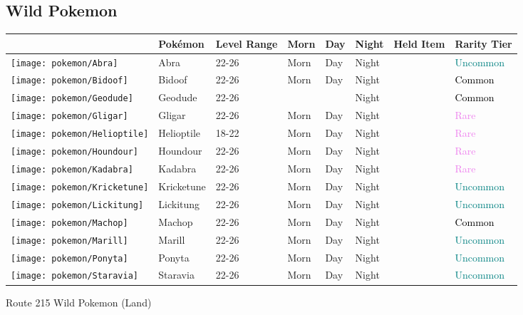 \subsection{Wild Pokemon}%
\label{subsec:WildPokemon}%
\begin{longtable}{||l l l l l l l l||}%
\hline%
&Pokémon&Level Range&Morn&Day&Night&Held Item&Rarity Tier\\%
\hline%
\endhead%
\hline%
\texttt{[image: pokemon/Abra]}&Abra&22{-}26&Morn&Day&Night&&\textcolor{teal}{%
Uncommon%
}\\%
\hline%
\texttt{[image: pokemon/Bidoof]}&Bidoof&22{-}26&Morn&Day&Night&&\textcolor{black}{%
Common%
}\\%
\hline%
\texttt{[image: pokemon/Geodude]}&Geodude&22{-}26&&&Night&&\textcolor{black}{%
Common%
}\\%
\hline%
\texttt{[image: pokemon/Gligar]}&Gligar&22{-}26&Morn&Day&Night&&\textcolor{violet}{%
Rare%
}\\%
\hline%
\texttt{[image: pokemon/Helioptile]}&Helioptile&18{-}22&Morn&Day&Night&&\textcolor{violet}{%
Rare%
}\\%
\hline%
\texttt{[image: pokemon/Houndour]}&Houndour&22{-}26&Morn&Day&Night&&\textcolor{violet}{%
Rare%
}\\%
\hline%
\texttt{[image: pokemon/Kadabra]}&Kadabra&22{-}26&Morn&Day&Night&&\textcolor{violet}{%
Rare%
}\\%
\hline%
\texttt{[image: pokemon/Kricketune]}&Kricketune&22{-}26&Morn&Day&Night&&\textcolor{teal}{%
Uncommon%
}\\%
\hline%
\texttt{[image: pokemon/Lickitung]}&Lickitung&22{-}26&Morn&Day&Night&&\textcolor{teal}{%
Uncommon%
}\\%
\hline%
\texttt{[image: pokemon/Machop]}&Machop&22{-}26&Morn&Day&Night&&\textcolor{black}{%
Common%
}\\%
\hline%
\texttt{[image: pokemon/Marill]}&Marill&22{-}26&Morn&Day&Night&&\textcolor{teal}{%
Uncommon%
}\\%
\hline%
\texttt{[image: pokemon/Ponyta]}&Ponyta&22{-}26&Morn&Day&Night&&\textcolor{teal}{%
Uncommon%
}\\%
\hline%
\texttt{[image: pokemon/Staravia]}&Staravia&22{-}26&Morn&Day&Night&&\textcolor{teal}{%
Uncommon%
}\\%
\hline%
\end{longtable}%
\caption{Route 215 Wild Pokemon (Land)}